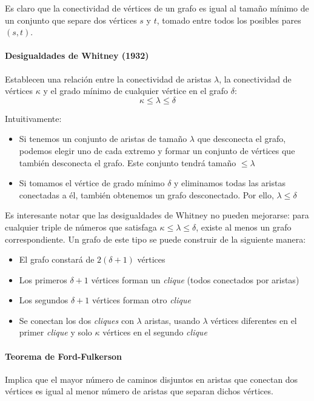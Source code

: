 \documentclass[a4paper]{article}
\begin{document}
Es claro que la conectividad de vértices de un grafo es igual al tamaño mínimo de un conjunto que separe dos vértices \(s\) y \(t\), tomado entre todos los posibles pares \((s, t)\).

\paragraph{Desigualdades de Whitney (1932)}
Establecen una relación entre la conectividad de aristas \(\lambda\), la conectividad de vértices \(\kappa\) y el grado mínimo de cualquier vértice en el grafo \(\delta\):
\[
\kappa \leq \lambda \leq \delta
\]

Intuitivamente:
\begin{itemize}
    \item Si tenemos un conjunto de aristas de tamaño \(\lambda\) que desconecta el grafo, podemos elegir uno de cada extremo y formar un conjunto de vértices que también desconecta el grafo. Este conjunto tendrá tamaño \(\leq \lambda\)
    \item Si tomamos el vértice de grado mínimo \(\delta\) y eliminamos todas las aristas conectadas a él, también obtenemos un grafo desconectado. Por ello, \(\lambda \leq \delta\)
\end{itemize}

Es interesante notar que las desigualdades de Whitney no pueden mejorarse: para cualquier triple de números que satisfaga \(\kappa \leq \lambda \leq \delta\), existe al menos un grafo correspondiente. Un grafo de este tipo se puede construir de la siguiente manera:
\begin{itemize}
    \item El grafo constará de \(2(\delta + 1)\) vértices
    \item Los primeros \(\delta + 1\) vértices forman un \textit{clique} (todos conectados por aristas)
    \item Los segundos \(\delta + 1\) vértices forman otro \textit{clique}
    \item Se conectan los dos \textit{cliques} con \(\lambda\) aristas, usando \(\lambda\) vértices diferentes en el primer \textit{clique} y solo \(\kappa\) vértices en el segundo \textit{clique}
\end{itemize}

\paragraph{Teorema de Ford-Fulkerson}
Implica que el mayor número de caminos disjuntos en aristas que conectan dos vértices es igual al menor número de aristas que separan dichos vértices.
\end{document}
